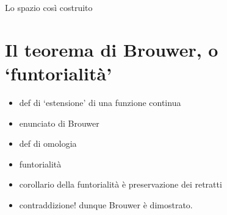 Lo spazio così costruito
\section*{Il teorema di Brouwer, o `funtorialità'}
\begin{itemize}
 \item def di `estensione' di una funzione continua
 \item enunciato di Brouwer
 \item def di omologia
 \item funtorialità
 \item corollario della funtorialità è preservazione dei retratti
 \item contraddizione! dunque Brouwer è dimostrato.
\end{itemize}


